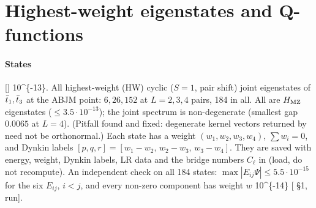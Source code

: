 \section{Highest-weight eigenstates and Q-functions}\label{sec:states}

\paragraph{States} [] \num{10^{-13}}. All highest-weight (HW) cyclic ($S=1$, pair shift) joint eigenstates of $\bar t_1,\bar t_3$
at the ABJM point: $6,26,152$ at $L=2,3,4$ pairs, 184 in all. All are $H_{\rm MZ}$ eigenstates ($\le3.5\cdot10^{-13}$); the joint spectrum is non-degenerate
(smallest gap $0.0065$ at $L=4$). (Pitfall found and fixed: degenerate kernel vectors returned by  need not be orthonormal.) Each state has a weight
$(w_1,w_2,w_3,w_4)$, $\sum w_i=0$, and Dynkin labels $[p,q,r]=[w_1-w_2,\,w_2-w_3,\,w_3-w_4]$. They are saved with energy, weight, Dynkin labels, LR data and the
bridge numbers $C_\ell$ in  (load, do not recompute). An independent check on all 184 states: $\max|E_{ij}\Psi|\le5.5\cdot10^{-15}$ for the six
$E_{ij}$, $i<j$, and every non-zero component has weight $w$ \num{10^{-14}} [ \S1, run].

